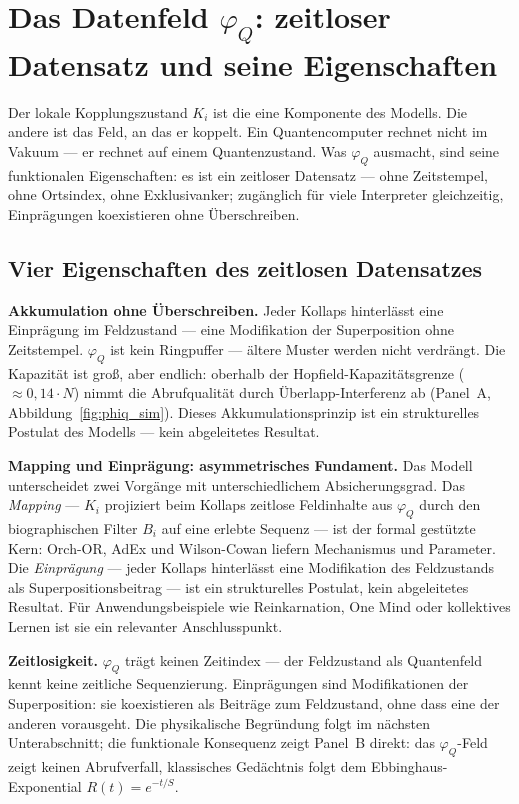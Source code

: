 \documentclass[11pt,a4paper]{article}
\begin{document}

\section{Das Datenfeld $\varphi_Q$: zeitloser Datensatz und seine Eigenschaften}
\label{sec:datenfeld}

Der lokale Kopplungszustand $K_i$ ist die eine Komponente des Modells. Die
andere ist das Feld, an das er koppelt. Ein Quantencomputer rechnet nicht im Vakuum — er
rechnet auf einem Quantenzustand. Was $\varphi_Q$ ausmacht, sind seine
funktionalen Eigenschaften: es ist ein zeitloser Datensatz — ohne Zeitstempel,
ohne Ortsindex, ohne Exklusivanker; zugänglich für viele Interpreter gleichzeitig,
Einprägungen koexistieren ohne Überschreiben.

\subsection*{Vier Eigenschaften des zeitlosen Datensatzes}

\textbf{Akkumulation ohne Überschreiben.} Jeder Kollaps hinterlässt eine
Einprägung im Feldzustand — eine Modifikation der Superposition ohne Zeitstempel.
$\varphi_Q$ ist kein Ringpuffer — ältere Muster werden nicht verdrängt. Die Kapazität ist groß, aber endlich: oberhalb der
Hopfield-Kapazitätsgrenze (${\approx}0{,}14 \cdot N$) nimmt die
Abrufqualität durch Überlapp-Interferenz ab (Panel~A,
Abbildung~\ref{fig:phiq_sim}).
Dieses Akkumulationsprinzip ist ein strukturelles Postulat des Modells — kein abgeleitetes Resultat.

\textbf{Mapping und Einprägung: asymmetrisches Fundament.}
Das Modell unterscheidet zwei Vorgänge mit unterschiedlichem Absicherungsgrad.
Das \emph{Mapping} — $K_i$ projiziert beim Kollaps zeitlose Feldinhalte aus
$\varphi_Q$ durch den biographischen Filter $B_i$ auf eine erlebte Sequenz —
ist der formal gestützte Kern: Orch-OR, AdEx und Wilson-Cowan liefern
Mechanismus und Parameter.
Die \emph{Einprägung} — jeder Kollaps hinterlässt eine Modifikation des
Feldzustands als Superpositionsbeitrag — ist ein strukturelles Postulat, kein
abgeleitetes Resultat. Für Anwendungsbeispiele wie Reinkarnation, One Mind
oder kollektives Lernen ist sie ein relevanter Anschlusspunkt.

\textbf{Zeitlosigkeit.} $\varphi_Q$ trägt keinen Zeitindex — der Feldzustand als Quantenfeld
kennt keine zeitliche Sequenzierung. Einprägungen sind Modifikationen
der Superposition: sie koexistieren als Beiträge zum Feldzustand, ohne
dass eine der anderen vorausgeht. Die physikalische Begründung
folgt im nächsten Unterabschnitt; die funktionale Konsequenz zeigt
Panel~B direkt: das $\varphi_Q$-Feld zeigt keinen Abrufverfall,
klassisches Gedächtnis folgt dem Ebbinghaus-Exponential $R(t) = e^{-t/S}$.
\end{document}
